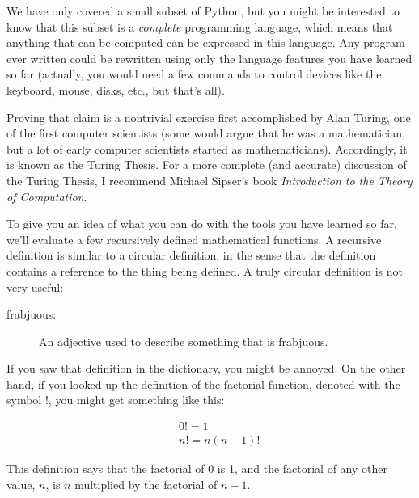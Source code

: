 \documentclass[10pt]{book}
\begin{document}

We have only covered a small subset of Python, but you might
be interested to know that this subset is a {\em complete}
programming language, which means that anything that can be
computed can be expressed in this language.  Any program ever written
could be rewritten using only the language features you have learned
so far (actually, you would need a few commands to control devices
like the keyboard, mouse, disks, etc., but that's all).

Proving that claim is a nontrivial exercise first accomplished by Alan
Turing, one of the first computer scientists (some would argue that he
was a mathematician, but a lot of early computer scientists started as
mathematicians).  Accordingly, it is known as the Turing Thesis.
For a more complete (and accurate) discussion of the Turing Thesis,
I recommend Michael Sipser's book {\em Introduction to the
Theory of Computation}.

To give you an idea of what you can do with the tools you have learned
so far, we'll evaluate a few recursively defined mathematical
functions.  A recursive definition is similar to a circular
definition, in the sense that the definition contains a reference to
the thing being defined.  A truly circular definition is not very
useful:

\begin{description}

\item[frabjuous:] An adjective used to describe something that is frabjuous.

\end{description}


If you saw that definition in the dictionary, you might be annoyed. On
the other hand, if you looked up the definition of the factorial
function, denoted with the symbol $!$, you might get something like
this:

\vspace{-0.35in}
\begin{eqnarray*}
&&  0! = 1 \\
&&  n! = n (n-1)!
\end{eqnarray*}
\vspace{-0.25in}

This definition says that the factorial of 0 is 1, and the factorial
of any other value, $n$, is $n$ multiplied by the factorial of $n-1$.
\end{document}
